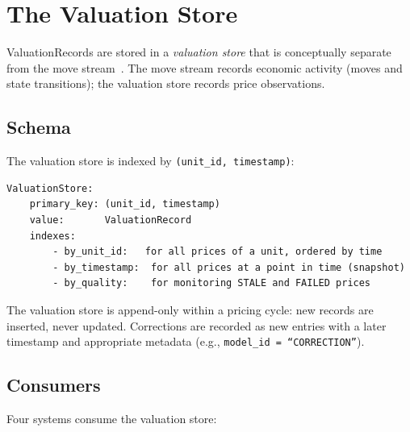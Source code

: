 \documentclass[11pt,a4paper]{article}
\begin{document}
\section{The Valuation Store}
\label{sec:valuation-store}

ValuationRecords are stored in a \emph{valuation store} that is conceptually separate from the move stream~\cite[\S8]{ledger}.  The move stream records economic activity (moves and state transitions); the valuation store records price observations.

\subsection{Schema}

The valuation store is indexed by \texttt{(unit\_id, timestamp)}:

\begin{lstlisting}
ValuationStore:
    primary_key: (unit_id, timestamp)
    value:       ValuationRecord
    indexes:
        - by_unit_id:   for all prices of a unit, ordered by time
        - by_timestamp:  for all prices at a point in time (snapshot)
        - by_quality:    for monitoring STALE and FAILED prices
\end{lstlisting}

\noindent The valuation store is append-only within a pricing cycle: new records are inserted, never updated.  Corrections are recorded as new entries with a later timestamp and appropriate metadata (e.g., \texttt{model\_id = ``CORRECTION''}).

\subsection{Consumers}

Four systems consume the valuation store:
\end{document}
